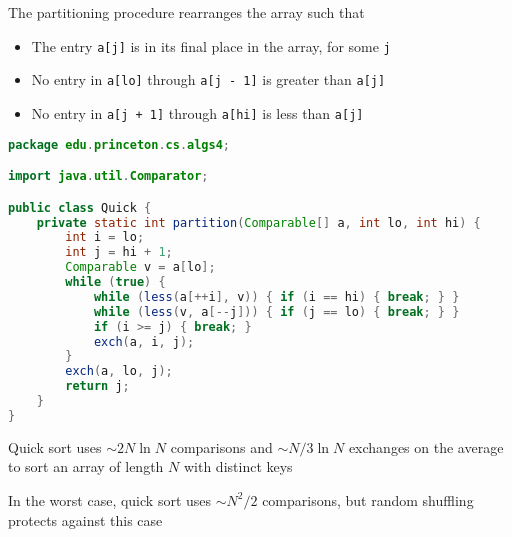 \documentclass[8pt,a4paper,compress]{beamer}
\begin{document}
\begin{frame}[fragile]
\pause

The partitioning procedure rearranges the array such that
\begin{itemize}
\item The entry \lstinline{a[j]} is in its final place in the array, for some \lstinline{j}
\item No entry in \lstinline{a[lo]} through \lstinline{a[j - 1]} is greater than \lstinline{a[j]}
\item No entry in \lstinline{a[j + 1]} through \lstinline{a[hi]} is less than \lstinline{a[j]}
\end{itemize}

\pause
\bigskip

\begin{lstlisting}[language=Java]
package edu.princeton.cs.algs4;

import java.util.Comparator;

public class Quick {
    private static int partition(Comparable[] a, int lo, int hi) {
        int i = lo;
        int j = hi + 1;
        Comparable v = a[lo];
        while (true) { 
            while (less(a[++i], v)) { if (i == hi) { break; } }
            while (less(v, a[--j])) { if (j == lo) { break; } }
            if (i >= j) { break; }
            exch(a, i, j);
        }
        exch(a, lo, j);
        return j;
    }
}
\end{lstlisting}
\end{frame}

\begin{frame}[fragile]
\pause

Trace
\begin{center}
}
\end{center}
\end{frame}

\begin{frame}[fragile]
\pause

Quick sort uses $\sim 2N\ln N$ comparisons and $\sim N/3\ln N$ exchanges on the average to sort an array of length $N$ with distinct keys

\pause
\bigskip

In the worst case, quick sort uses $\sim N^2/2$ comparisons, but random shuffling protects against this case
\end{frame}
\end{document}
